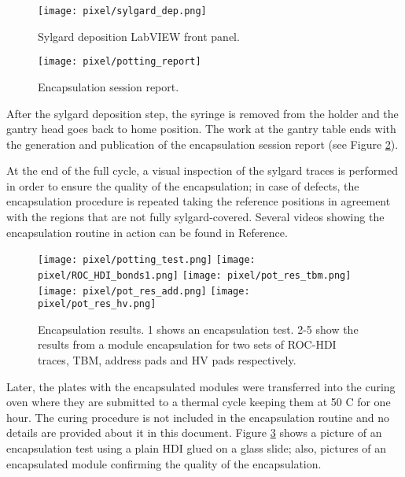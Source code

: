\begin{figure}[h]
\centering
  \texttt{[image: pixel/sylgard\_dep.png]}
  \caption{Sylgard deposition LabVIEW front panel.}\label{fig:sylgard_dep}
\end{figure}

\begin{figure}[h]
\centering
  \texttt{[image: pixel/potting\_report]}
 \caption[Encapsulation session report.]{Encapsulation session report.}\label{fig:potting_report}
\end{figure}

After the sylgard deposition step, the syringe is removed from the holder and the gantry head goes back to home position. The work at the gantry table ends with the generation and publication of the encapsulation session report (see Figure \ref{fig:potting_report}).   

At the end of the full cycle, a visual inspection of the sylgard traces is performed in order to ensure the quality of the encapsulation; in case of defects, the encapsulation procedure is repeated taking the reference positions in agreement with the regions that are not fully sylgard-covered. Several videos showing the encapsulation routine in action can be found in Reference\cite{jmonroy_channel}.

\begin{figure}[h]
\centering
  \texttt{[image: pixel/potting\_test.png]}
  \texttt{[image: pixel/ROC\_HDI\_bonds1.png]}
  \texttt{[image: pixel/pot\_res\_tbm.png]}
  \texttt{[image: pixel/pot\_res\_add.png]}
  \texttt{[image: pixel/pot\_res\_hv.png]}
  \caption[Encapsulation results.]{Encapsulation results. 1 shows an encapsulation test. 2-5 show the results from a module encapsulation for two sets of ROC-HDI traces, TBM, address pads and HV pads respectively.}\label{fig:potted_module}
\end{figure}

Later, the plates with the encapsulated modules were transferred into the curing oven where they are submitted to a thermal cycle keeping them at 50 C for one hour. The curing procedure is not included in the encapsulation routine and no details are provided about it in this document. Figure \ref{fig:potted_module} shows a picture of an encapsulation test using a plain HDI glued on a glass slide; also, pictures of an encapsulated module confirming the quality of the encapsulation.  

